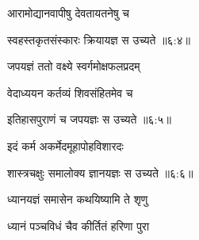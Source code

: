 
{\devanagarifont आरामोद्यानवापीषु देवतायतनेषु च \thinspace{\dandab} \dontdisplaylinenum }%


{\devanagarifont स्वहस्तकृतसंस्कारः क्रियायज्ञ स उच्यते {॥६:४॥} \veg\dontdisplaylinenum }%



{\devanagarifont जपयज्ञं ततो वक्ष्ये स्वर्गमोक्षफलप्रदम् \thinspace{\dandab} \dontdisplaylinenum }%

{\devanagarifont वेदाध्ययन कर्तव्यं शिवसंहितमेव च  \danda\dontdisplaylinenum }%


{\devanagarifont इतिहासपुराणं च जपयज्ञः स उच्यते {॥६:५॥} \veg\dontdisplaylinenum }%



{\devanagarifont इदं कर्म अकर्मेदमूहापोहविशारदः \thinspace{\dandab} \dontdisplaylinenum }%


{\devanagarifont शास्त्रचक्षुः समालोक्य ज्ञानयज्ञः स उच्यते {॥६:६॥} \veg\dontdisplaylinenum }%



{\devanagarifont ध्यानयज्ञं समासेन कथयिष्यामि ते शृणु \thinspace{\dandab} \dontdisplaylinenum }%

{\devanagarifont ध्यानं पञ्चविधं चैव कीर्तितं हरिणा पुरा  \danda\dontdisplaylinenum }%

